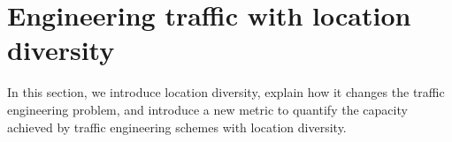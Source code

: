 \section{Engineering traffic with location diversity}
\label{sec:locdiv-background}

In this section, we introduce location diversity, explain how it changes the traffic engineering problem, and introduce a new metric to quantify the capacity achieved by traffic engineering schemes with location diversity.








